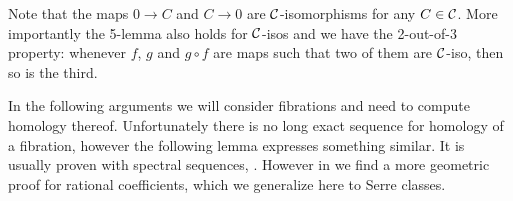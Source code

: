 
Note that the maps $0 \to C$ and $C \to 0$ are $\mathcal{C}$-isomorphisms for any $C \in \mathcal{C}$. More importantly the 5-lemma also holds for $\mathcal{C}$-isos and we have the 2-out-of-3 property: whenever $f$, $g$ and $g \circ f$ are maps such that two of them are $\mathcal{C}$-iso, then so is the third.

In the following arguments we will consider fibrations and need to compute homology thereof. Unfortunately there is no long exact sequence for homology of a fibration, however the following lemma expresses something similar. It is usually proven with spectral sequences,  \cite[Ch. 2 Thm 1]{serre}. However in \cite{kreck} we find a more geometric proof for rational coefficients, which we generalize here to Serre classes.

